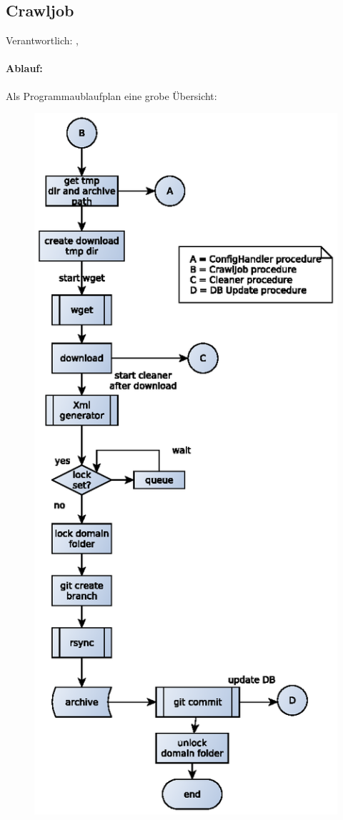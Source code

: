 \newpage
\subsection{Crawljob}
\label{sub:crawljob}
Verantwortlich: \ciii, \ci 

\paragraph{Ablauf:}
    Als Programmaublaufplan eine grobe Übersicht:
\label{par:ablauf_}
\begin{figure}[H]
	\centering
	\label{dia:design:backend:overview}
	\includegraphics[width=1.3\textwidth]{design/backend/gfx/crawljob.eps}

\end{figure}
